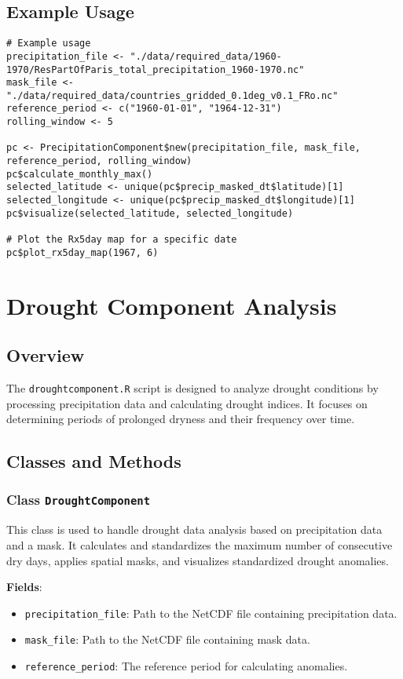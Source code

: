 \documentclass[a4paper,12pt]{article}
\begin{document}
\subsection{Example Usage}

\begin{verbatim}
# Example usage
precipitation_file <- "./data/required_data/1960-1970/ResPartOfParis_total_precipitation_1960-1970.nc"
mask_file <- "./data/required_data/countries_gridded_0.1deg_v0.1_FRo.nc"
reference_period <- c("1960-01-01", "1964-12-31")
rolling_window <- 5

pc <- PrecipitationComponent$new(precipitation_file, mask_file, reference_period, rolling_window)
pc$calculate_monthly_max()
selected_latitude <- unique(pc$precip_masked_dt$latitude)[1]
selected_longitude <- unique(pc$precip_masked_dt$longitude)[1]
pc$visualize(selected_latitude, selected_longitude)

# Plot the Rx5day map for a specific date
pc$plot_rx5day_map(1967, 6)
\end{verbatim}

\section{Drought Component Analysis}
\label{sec:droughtcomponent}

\subsection{Overview}
The \texttt{droughtcomponent.R} script is designed to analyze drought conditions by processing precipitation data and calculating drought indices. It focuses on determining periods of prolonged dryness and their frequency over time.

\subsection{Classes and Methods}

\subsubsection{Class \texttt{DroughtComponent}}
This class is used to handle drought data analysis based on precipitation data and a mask. It calculates and standardizes the maximum number of consecutive dry days, applies spatial masks, and visualizes standardized drought anomalies.

\textbf{Fields}:
\begin{itemize}
    \item \texttt{precipitation\_file}: Path to the NetCDF file containing precipitation data.
    \item \texttt{mask\_file}: Path to the NetCDF file containing mask data.
    \item \texttt{reference\_period}: The reference period for calculating anomalies.
\end{itemize}
\end{document}
